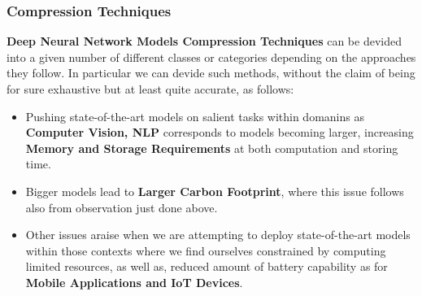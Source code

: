 



\begin{frame}

\frametitle{Compression Techniques}

\textbf{Deep Neural Network Models Compression Techniques} can be devided into a given number of different classes or categories depending on the approaches they follow. In particular we can devide such methods, without the claim of being for sure exhaustive but at least quite accurate, as follows:

\begin{itemize}

\item Pushing state-of-the-art models on salient tasks within domanins as \textbf{Computer Vision, NLP} corresponds to models becoming larger, increasing \textbf{Memory and Storage Requirements} at both computation and storing time.

\item Bigger models lead to \textbf{Larger Carbon Footprint}, where this issue follows also from observation just done above.

\item Other issues araise when we are attempting to deploy state-of-the-art models within those contexts where we find ourselves constrained by computing limited resources, as well as, reduced amount of battery capability as for \textbf{Mobile Applications and IoT Devices}.

\end{itemize}

\end{frame}
